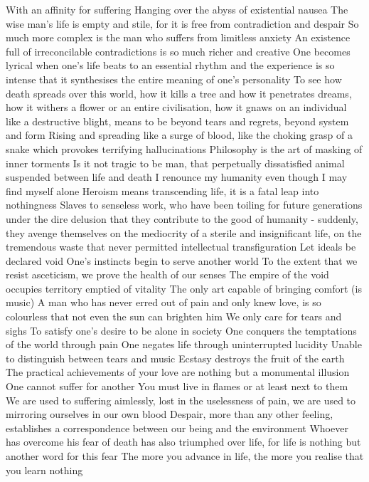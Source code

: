 \documentclass{article}
\begin{document}
\iffalse
With an affinity for suffering
Hanging over the abyss of existential nausea
The wise man's life is empty and stile, for it is free from contradiction and despair
So much more complex is the man who suffers from limitless anxiety
An existence full of irreconcilable contradictions is so much richer and creative
One becomes lyrical when one's life beats to an essential rhythm and the experience is so intense that it synthesises the entire meaning of one's personality
To see how death spreads over this world, how it kills a tree and how it penetrates dreams, how it withers a flower or an entire civilisation, how it gnaws on an individual like a destructive blight, means to be beyond tears and regrets, beyond system and form
Rising and spreading like a surge of blood, like the choking grasp of a snake which provokes terrifying hallucinations
Philosophy is the art of masking of inner torments
Is it not tragic to be man, that perpetually dissatisfied animal suspended between life and death
I renounce my humanity even though I may find myself alone
Heroism means transcending life, it is a fatal leap into nothingness
Slaves to senseless work, who have been toiling for future generations under the dire delusion that they contribute to the good of humanity - suddenly, they avenge themselves on the mediocrity of a sterile and insignificant life, on the tremendous waste that never permitted intellectual transfiguration
Let ideals be declared void
One's instincts begin to serve another world
To the extent that we resist asceticism, we prove the health of our senses
The empire of the void occupies territory emptied of vitality
The only art capable of bringing comfort (is music)
A man who has never erred out of pain and only knew love, is so colourless that not even the sun can brighten him
We only care for tears and sighs
To satisfy one's desire to be alone in society
One conquers the temptations of the world through pain
One negates life through uninterrupted lucidity
Unable to distinguish between tears and music
Ecstasy destroys the fruit of the earth
The practical achievements of your love are nothing but a monumental illusion
One cannot suffer for another
You must live in flames or at least next to them
We are used to suffering aimlessly, lost in the uselessness of pain, we are used to mirroring ourselves in our own blood
Despair, more than any other feeling, establishes a correspondence between our being and the environment
Whoever has overcome his fear of death has also triumphed over life, for life is nothing but another word for this fear
The more you advance in life, the more you realise that you learn nothing
\end{document}
